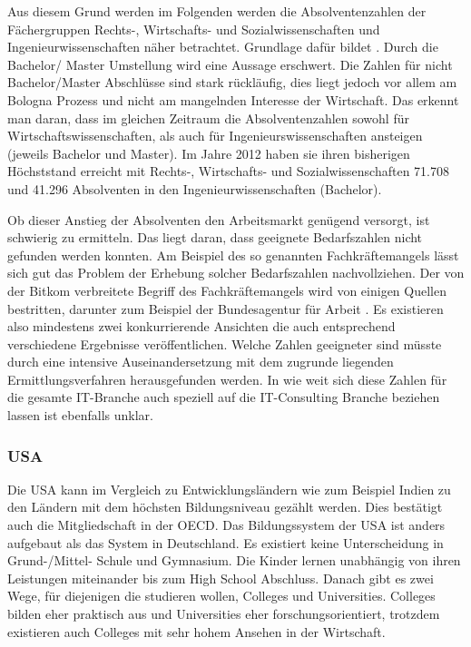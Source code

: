 Aus diesem Grund werden im Folgenden werden die Absolventenzahlen der Fächergruppen Rechts-, Wirtschafts- und Sozialwissenschaften und Ingenieurwissenschaften näher betrachtet.
Grundlage dafür bildet \cite{absolventen} . Durch die Bachelor/ Master Umstellung wird eine Aussage erschwert. Die Zahlen für nicht Bachelor/Master Abschlüsse sind stark rückläufig, dies liegt jedoch vor allem am Bologna Prozess und nicht am mangelnden Interesse der Wirtschaft. Das erkennt man daran, dass im gleichen Zeitraum die Absolventenzahlen sowohl für Wirtschaftswissenschaften, als auch für Ingenieurswissenschaften ansteigen (jeweils Bachelor und Master). Im Jahre 2012 haben sie ihren bisherigen Höchststand erreicht mit Rechts-, Wirtschafts- und Sozialwissenschaften 71.708 und 41.296 Absolventen in den Ingenieurwissenschaften (Bachelor).

Ob dieser Anstieg der Absolventen den Arbeitsmarkt genügend versorgt, ist schwierig zu ermitteln. Das liegt daran, dass geeignete Bedarfszahlen nicht gefunden werden konnten. Am Beispiel des so genannten Fachkräftemangels lässt sich gut das Problem der Erhebung solcher Bedarfszahlen nachvollziehen. Der von der Bitkom verbreitete Begriff \cite{fachkraft} des Fachkräftemangels wird von einigen Quellen bestritten, darunter zum Beispiel der Bundesagentur für Arbeit \cite{fachkraftnein}. Es existieren also mindestens zwei konkurrierende Ansichten die auch entsprechend verschiedene Ergebnisse veröffentlichen. Welche Zahlen geeigneter sind müsste durch eine intensive Auseinandersetzung mit dem zugrunde liegenden Ermittlungsverfahren herausgefunden werden.  In wie weit sich diese Zahlen für die gesamte IT-Branche auch speziell auf die IT-Consulting Branche beziehen lassen ist ebenfalls unklar.

\subsubsection*{USA}
Die USA kann im Vergleich zu Entwicklungsländern wie zum Beispiel Indien zu den Ländern mit dem höchsten Bildungsniveau gezählt werden. Dies bestätigt auch die Mitgliedschaft in der OECD. Das Bildungssystem der USA ist anders aufgebaut als das System in Deutschland. Es existiert keine Unterscheidung in Grund-/Mittel- Schule und Gymnasium. Die Kinder lernen unabhängig von ihren Leistungen miteinander bis zum High School Abschluss. Danach gibt es zwei Wege, für diejenigen die studieren wollen, Colleges und Universities. Colleges bilden eher praktisch aus und Universities eher forschungsorientiert, trotzdem existieren auch Colleges mit sehr hohem Ansehen in der Wirtschaft. 

